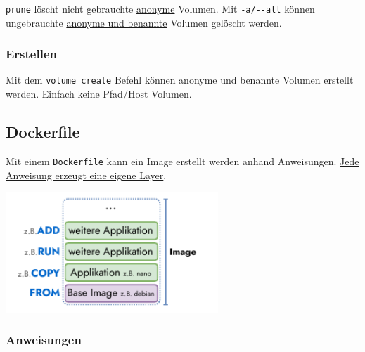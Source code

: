 \documentclass[
  10pt,
  a4paper,
  twocolumn]{article}
\newenvironment{Shaded}{}{}
\newcommand{\ExtensionTok}[1]{\textcolor[rgb]{0.84,0.23,0.29}{\textbf{#1}}}
\newcommand{\NormalTok}[1]{\textcolor[rgb]{0.14,0.16,0.18}{#1}}
\newcommand{\PreprocessorTok}[1]{\textcolor[rgb]{0.84,0.23,0.29}{#1}}
\newcommand{\SpecialStringTok}[1]{\textcolor[rgb]{0.01,0.18,0.38}{#1}}
\begin{document}
\texttt{prune} löscht nicht gebrauchte \ul{anonyme} Volumen. Mit
\texttt{-a/-\/-all} können ungebrauchte \ul{anonyme und benannte}
Volumen gelöscht werden.

\begin{Shaded}
\end{Shaded}

\subsubsection{\texorpdfstring{{\small \faTerminal\hspace{1mm}}
Erstellen}{ Erstellen}}\label{erstellen}

Mit dem \texttt{volume\ create} Befehl können anonyme und benannte
Volumen erstellt werden. Einfach keine Pfad/Host Volumen.

\begin{Shaded}
\end{Shaded}

\subsection{Dockerfile}\label{dockerfile}

Mit einem \faFile[regular]\texttt{Dockerfile} kann ein Image erstellt
werden anhand Anweisungen. \ul{Jede Anweisung erzeugt eine eigene
Layer}.

\begin{center}
\includegraphics[width=8cm,height=\textheight]{images/docker/dockerfile_image.pdf}
\end{center}

\subsubsection{Anweisungen}\label{anweisungen}
\end{document}
